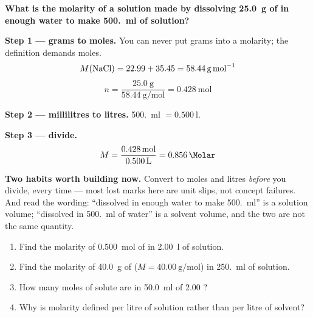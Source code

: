 \documentclass{apchem-worksheet}
\begin{document}
\begin{workedexample}
\textbf{What is the molarity of a solution made by dissolving
\SI{25.0}{\gram} of  in enough water to make
\SI{500.}{\milli\litre} of solution?}

\textbf{Step 1 --- grams to moles.} You can never put grams into a
molarity; the definition demands moles.
\[ M(\ce{NaCl}) = 22.99 + 35.45 = \SI{58.44}{\gram\per\mole} \]
\[ n = \frac{\SI{25.0}{\gram}}{\SI{58.44}{\gram\per\mole}}
     = \SI{0.428}{\mole} \]

\textbf{Step 2 --- millilitres to litres.} \SI{500.}{\milli\litre}
$= \SI{0.500}{\litre}$.

\textbf{Step 3 --- divide.}
\[ M = \frac{\SI{0.428}{\mole}}{\SI{0.500}{\litre}}
     = \mathbf{\SI{0.856}{\Molar}} \]

\textbf{Two habits worth building now.} Convert to moles and litres
\emph{before} you divide, every time --- most lost marks here are unit
slips, not concept failures. And read the wording: ``dissolved in enough
water to make \SI{500.}{\milli\litre}'' is a solution volume;
``dissolved in \SI{500.}{\milli\litre} of water'' is a solvent volume,
and the two are not the same quantity.
\end{workedexample}

\begin{yourturn}
\begin{enumerate}[leftmargin=*,itemsep=0.5em]
  \item Find the molarity of \SI{0.500}{\mole} of  in
        \SI{2.00}{\litre} of solution. \workspace[1.6cm]
  \item Find the molarity of \SI{40.0}{\gram} of 
        ($M = \SI{40.00}{\gram\per\mole}$) in \SI{250.}{\milli\litre}
        of solution. \workspace[1.8cm]
  \item How many moles of solute are in \SI{50.0}{\milli\litre} of
        \SI{2.00}{\Molar} ? \workspace[1.6cm]
  \item Why is molarity defined per litre of solution rather than per
        litre of solvent? \workspace[1.8cm]
\end{enumerate}
\end{yourturn}
\end{document}

